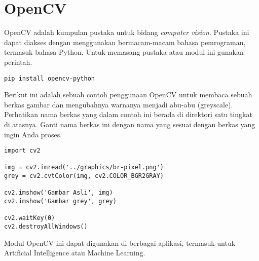 \section{OpenCV}
OpenCV adalah kumpulan pustaka untuk bidang {\em computer vision}.
Pustaka ini dapat diakses dengan menggunakan bermacam-macam bahasa pemrograman,
termasuk bahasa Python.
Untuk memasang pustaka atau modul ini gunakan perintah.

\begin{verbatim}
pip install opencv-python
\end{verbatim}

Berikut ini adalah sebuah contoh penggunaan OpenCV untuk membaca
sebuah berkas gambar dan mengubahnya warnanya menjadi abu-abu (greyscale).
Perhatikan nama berkas yang dalam contoh ini berada di direktori
satu tingkat di atasnya. Ganti nama berkas ini dengan nama yang sesuai
dengan berkas yang ingin Anda proses.

\begin{verbatim}
import cv2

img = cv2.imread('../graphics/br-pixel.png')
grey = cv2.cvtColor(img, cv2.COLOR_BGR2GRAY)

cv2.imshow('Gambar Asli', img)
cv2.imshow('Gambar grey', grey)

cv2.waitKey(0)
cv2.destroyAllWindows()
\end{verbatim}

Modul OpenCV ini dapat digunakan di berbagai aplikasi, termasuk untuk
Artificial Intelligence atau Machine Learning.
